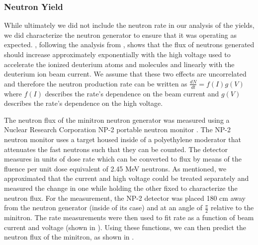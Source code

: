 \subsubsection{Neutron Yield}

While ultimately we did not include the neutron rate in our analysis of the yields, we did characterize the neutron generator to ensure that it was operating as expected.  , following the analysis from , shows that the flux of neutrons generated should increase approximately exponentially with the high voltage used to accelerate the ionized deuterium atoms and molecules and linearly with the deuterium ion beam current.  We assume that these two effects are uncorrelated and therefore the neutron production rate can be written as $\frac{dN}{dt} = f(I)g(V)$ where $f(I)$ describes the rate's dependence on the beam current and $g(V)$ describes the rate's dependence on the high voltage.

The neutron flux of the minitron neutron generator was measured using a Nuclear Research Corporation NP-2 portable neutron monitor \cite{np2_manual}.  The NP-2 neutron monitor uses a  target housed inside of a polyethylene moderator that attenuates the fast neutrons such that they can be counted.  The detector measures in units of dose rate which can be converted to flux by means of the fluence per unit dose equivalent of 2.45 MeV neutrons.  As mentioned, we approximated that the current and high voltage could be treated separately and measured the change in one while holding the other fixed to characterize the neutron flux.  For the measurement, the NP-2 detector was placed 180 cm away from the neutron generator (inside of its case) and at an angle of $\frac{\pi}{2}$ relative to the minitron.  The rate measurements were then used to fit rate as a function of beam current and voltage (shown in ).  Using these functions, we can then predict the neutron flux of the minitron, as shown in .


